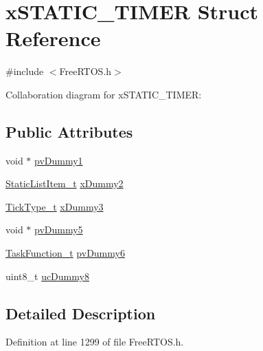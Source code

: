 \hypertarget{structx_s_t_a_t_i_c___t_i_m_e_r}{}\section{x\+S\+T\+A\+T\+I\+C\+\_\+\+T\+I\+M\+ER Struct Reference}
\label{structx_s_t_a_t_i_c___t_i_m_e_r}


{\ttfamily \#include $<$Free\+R\+T\+O\+S.\+h$>$}



Collaboration diagram for x\+S\+T\+A\+T\+I\+C\+\_\+\+T\+I\+M\+ER\+:
\subsection*{Public Attributes}
\begin{DoxyCompactItemize}
\item 
void $\ast$ \hyperlink{structx_s_t_a_t_i_c___t_i_m_e_r_a040499298faced6032f84f3a33c785fd}{pv\+Dummy1}
\item 
\hyperlink{externals_2freertos_2include_2_free_r_t_o_s_8h_a1d31bc0472385a87424518da484d9e09}{Static\+List\+Item\+\_\+t} \hyperlink{structx_s_t_a_t_i_c___t_i_m_e_r_a622e2e596e5829c9197bb44b9009474f}{x\+Dummy2}
\item 
\hyperlink{externals_2freertos_2portable_2_g_c_c_2_a_r_m___c_m0_2portmacro_8h_aa69c48c6e902ce54f70886e6573c92a9}{Tick\+Type\+\_\+t} \hyperlink{structx_s_t_a_t_i_c___t_i_m_e_r_a60d582d1d0b5b9b15e8050d5ae29bc30}{x\+Dummy3}
\item 
void $\ast$ \hyperlink{structx_s_t_a_t_i_c___t_i_m_e_r_a5150821e9535f86547aafbfc50d44423}{pv\+Dummy5}
\item 
\hyperlink{vendor_2ceedling_2plugins_2freertos_2vendor_2freertos_2include_2projdefs_8h_a9b32502ff92c255c686dacde53c1cba0}{Task\+Function\+\_\+t} \hyperlink{structx_s_t_a_t_i_c___t_i_m_e_r_ac0d22064153fd2394380a61528d3c705}{pv\+Dummy6}
\item 
uint8\+\_\+t \hyperlink{structx_s_t_a_t_i_c___t_i_m_e_r_a36a702a7e0e2fec558c8264ff3d88e93}{uc\+Dummy8}
\end{DoxyCompactItemize}


\subsection{Detailed Description}


Definition at line 1299 of file Free\+R\+T\+O\+S.\+h.



